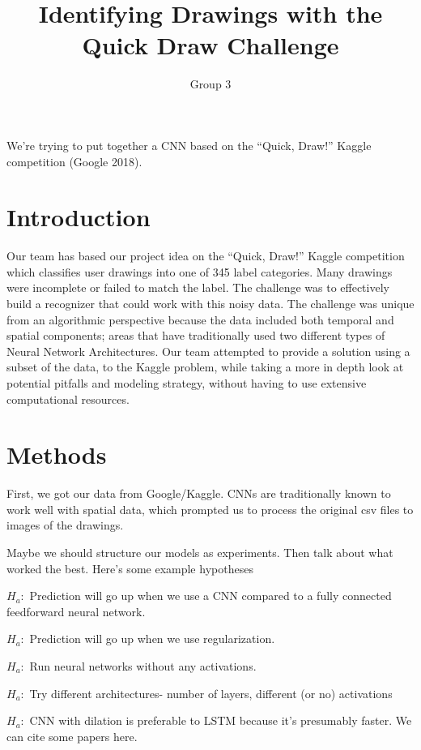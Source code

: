 \documentclass[]{article}
\title{Identifying Drawings with the Quick Draw Challenge}
\author{Group 3}
\date{}
\begin{document}
\maketitle

We're trying to put together a CNN based on the ``Quick, Draw!'' Kaggle
competition (Google 2018).

\section{Introduction}\label{introduction}

Our team has based our project idea on the ``Quick, Draw!'' Kaggle
competition which classifies user drawings into one of 345 label
categories. Many drawings were incomplete or failed to match the label.
The challenge was to effectively build a recognizer that could work with
this noisy data. The challenge was unique from an algorithmic
perspective because the data included both temporal and spatial
components; areas that have traditionally used two different types of
Neural Network Architectures. Our team attempted to provide a solution
using a subset of the data, to the Kaggle problem, while taking a more
in depth look at potential pitfalls and modeling strategy, without
having to use extensive computational resources.

\section{Methods}\label{methods}

First, we got our data from Google/Kaggle. CNNs are traditionally known
to work well with spatial data, which prompted us to process the
original csv files to images of the drawings.

Maybe we should structure our models as experiments. Then talk about
what worked the best. Here's some example hypotheses

\(H_a:\) Prediction will go up when we use a CNN compared to a fully
connected feedforward neural network.

\(H_a:\) Prediction will go up when we use regularization.

\(H_a:\) Run neural networks without any activations.

\(H_a:\) Try different architectures- number of layers, different (or
no) activations

\(H_a:\) CNN with dilation is preferable to LSTM because it's presumably
faster. We can cite some papers here.
\end{document}
